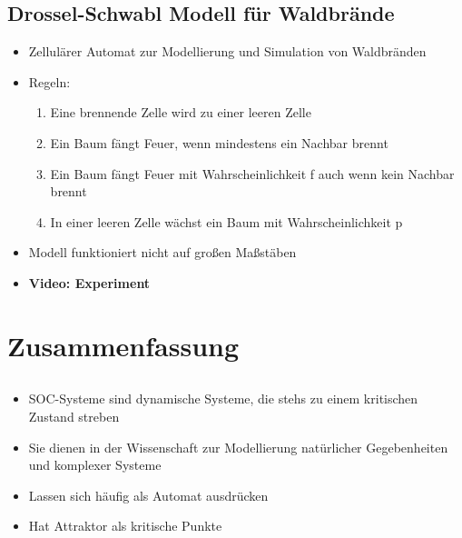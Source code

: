 \documentclass{beamer}
\begin{document}
\subsection{Drossel-Schwabl Modell für Waldbrände}
\begin{frame}{\insertsection}{\insertsubsection}
	\begin{itemize}
        \item Zellulärer Automat zur Modellierung und Simulation von Waldbränden
        \item Regeln:
        \begin{enumerate}
            \item Eine brennende Zelle wird zu einer leeren Zelle
            \item Ein Baum fängt Feuer, wenn mindestens ein Nachbar brennt
            \item Ein Baum fängt Feuer mit Wahrscheinlichkeit f auch wenn kein Nachbar brennt
            \item In einer leeren Zelle wächst ein Baum mit Wahrscheinlichkeit p
        \end{enumerate}
        \item Modell funktioniert nicht auf großen Maßstäben
        \item \textbf{Video: Experiment}
	\end{itemize}
\end{frame}

\section{Zusammenfassung}
\subsection{}
\begin{frame}{\insertsection}{\insertsubsection}
	\begin{itemize}
        \item SOC-Systeme sind dynamische Systeme, die stehs zu einem kritischen Zustand streben
        \item Sie dienen in der Wissenschaft zur Modellierung natürlicher Gegebenheiten und
            komplexer Systeme
        \item Lassen sich häufig als Automat ausdrücken
        \item Hat Attraktor als kritische Punkte
	\end{itemize}
\end{frame}
\end{document}
